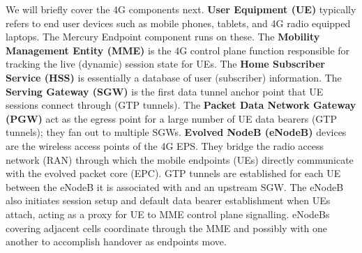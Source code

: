 We will briefly cover the 4G components next. \textbf{User Equipment
  (UE)} typically refers to end user devices such as mobile phones,
tablets, and 4G radio equipped laptops. The Mercury Endpoint component
runs on these. The \textbf{Mobility Management Entity (MME)} is the 4G
control plane function responsible for tracking the live (dynamic)
session state for UEs. The \textbf{Home Subscriber Service (HSS)} is
essentially a database of user (subscriber) information. The
\textbf{Serving Gateway (SGW)} is the first data tunnel anchor point
that UE sessions connect through (GTP tunnels). The \textbf{Packet
  Data Network Gateway (PGW)} act as the egress point for a large
number of UE data bearers (GTP tunnels); they fan out to multiple
SGWs.  \textbf{Evolved NodeB (eNodeB)} devices are the wireless access
points of the 4G EPS. They bridge the radio access network (RAN)
through which the mobile endpoints (UEs) directly communicate with the
evolved packet core (EPC). GTP tunnels are established for each UE
between the eNodeB it is associated with and an upstream SGW.  The
eNodeB also initiates session setup and default data bearer
establishment when UEs attach, acting as a proxy for UE to MME
control plane signalling. eNodeBs covering adjacent cells coordinate
through the MME and possibly with one another to accomplish handover
as endpoints move.

